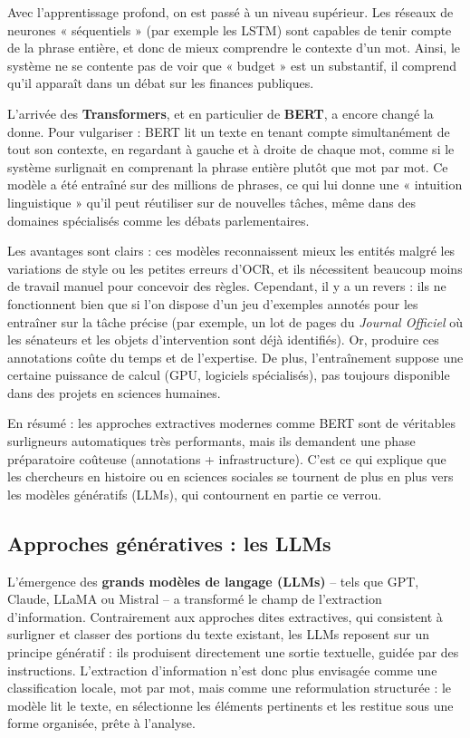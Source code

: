Avec l’apprentissage profond, on est passé à un niveau supérieur. Les réseaux de neurones « séquentiels » (par exemple les LSTM) sont capables de tenir compte de la phrase entière, et donc de mieux comprendre le contexte d’un mot. Ainsi, le système ne se contente pas de voir que « budget » est un substantif, il comprend qu’il apparaît dans un débat sur les finances publiques.

L’arrivée des \textbf{Transformers}, et en particulier de \textbf{BERT}, a encore changé la donne. Pour vulgariser : BERT lit un texte en tenant compte simultanément de tout son contexte, en regardant à gauche et à droite de chaque mot, comme si le système surlignait en comprenant la phrase entière plutôt que mot par mot. Ce modèle a été entraîné sur des millions de phrases, ce qui lui donne une « intuition linguistique » qu’il peut réutiliser sur de nouvelles tâches, même dans des domaines spécialisés comme les débats parlementaires.

Les avantages sont clairs : ces modèles reconnaissent mieux les entités malgré les variations de style ou les petites erreurs d’OCR, et ils nécessitent beaucoup moins de travail manuel pour concevoir des règles. Cependant, il y a un revers : ils ne fonctionnent bien que si l’on dispose d’un jeu d’exemples annotés pour les entraîner sur la tâche précise (par exemple, un lot de pages du \emph{Journal Officiel} où les sénateurs et les objets d’intervention sont déjà identifiés). Or, produire ces annotations coûte du temps et de l’expertise. De plus, l’entraînement suppose une certaine puissance de calcul (GPU, logiciels spécialisés), pas toujours disponible dans des projets en sciences humaines.

En résumé : les approches extractives modernes comme BERT sont de véritables surligneurs automatiques très performants, mais ils demandent une phase préparatoire coûteuse (annotations + infrastructure). C’est ce qui explique que les chercheurs en histoire ou en sciences sociales se tournent de plus en plus vers les modèles génératifs (LLMs), qui contournent en partie ce verrou.

\subsection{Approches génératives : les LLMs}

L’émergence des \textbf{grands modèles de langage (LLMs)} – tels que GPT, Claude, LLaMA ou Mistral – a transformé le champ de l’extraction d’information. Contrairement aux approches dites extractives, qui consistent à surligner et classer des portions du texte existant, les LLMs reposent sur un principe génératif : ils produisent directement une sortie textuelle, guidée par des instructions. L’extraction d’information n’est donc plus envisagée comme une classification locale, mot par mot, mais comme une reformulation structurée : le modèle lit le texte, en sélectionne les éléments pertinents et les restitue sous une forme organisée, prête à l’analyse.

